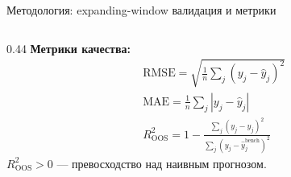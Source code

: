 \documentclass[aspectratio=169,10pt]{beamer}
\begin{document}
\begin{frame}{Методология: expanding-window валидация и метрики}
\begin{columns}[T]
\begin{column}{0.44\textwidth}
    \vspace{0.3em}
    \textbf{\color{hsedark}Метрики качества:}
    \begin{align*}
      &\text{RMSE} = \sqrt{\tfrac{1}{n}\textstyle\sum_j(y_j-\hat{y}_j)^2}\\[3pt]
      &\text{MAE}  = \tfrac{1}{n}\textstyle\sum_j|y_j-\hat{y}_j|\\[3pt]
      &R^2_{\text{OOS}} = 1 -
        \frac{\sum_j(y_j-\hat{y}_j)^2}{\sum_j(y_j-\hat{y}_j^{\text{bench}})^2}
    \end{align*}
    {\small $R^2_{\text{OOS}}>0$ — превосходство над наивным прогнозом.}
  \end{column}
\end{columns}
\end{frame}

\end{document}
